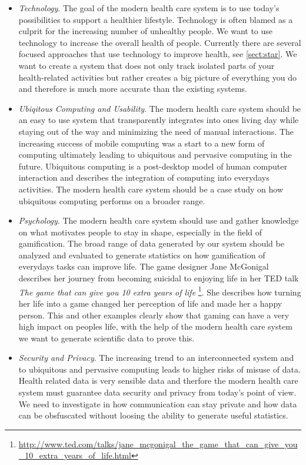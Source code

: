 \documentclass[a4paper,11pt]{article}
\begin{document}
\begin{itemize}
	\item \emph{Technology}. 
	The goal of the modern health care system is to use today's possibilities to support a healthier lifestyle. Technology is often blamed as a culprit for the increasing number of unhealthy people. We want to use technology to increase the overall health of people. Currently there are several focused approaches that use technology to improve health, see \ref{sect:star}. We want to create a system that does not only track isolated parts of your health-related activities but rather creates a big picture of everything you do and therefore is much more accurate than the existing systems.
	\item \emph{Ubiqitous Computing and Usability}.
	The modern health care system should be an easy to use system that transparently integrates into ones living day while staying out of the way and minimizing the need of manual interactions. The increasing success of mobile computing was a start to a new form of computing ultimately leading to ubiquitous and pervasive computing in the future. Ubiquitous computing is a post-desktop model of human computer interaction and describes the integration of computing into everydays activities. The modern health care system should be a case study on how ubiquitous computing performs on a broader range. 
	\item \emph{Psychology}.
	The modern health care system should use and gather knowledge on what motivates people to stay in shape, especially in the field of gamification. The broad range of data generated by our system should be analyzed and evaluated to generate statistics on how gamification of everydays tasks can improve life. The game designer Jane McGonigal describes her journey from becoming suicidal to enjoying life in her TED talk \emph{The game that can give you 10 extra years of life} \footnote{\url{http://www.ted.com/talks/jane_mcgonigal_the_game_that_can_give_you_10_extra_years_of_life.html}}. She describes how turning her life into a game changed her perception of life and made her a happy person. This and other examples clearly show that gaming can have a very high impact on peoples life, with the help of the modern health care system we want to generate scientific data to prove this.
	\item \emph{Security and Privacy}.
	The increasing trend to an interconnected system and to ubiquitous and pervasive computing leads to higher risks of misuse of data. Health related data is very sensible data and therfore the modern health care system must guarantee data security and privacy from today's point of view. We need to investigate in how communication can stay private and how data can be obsfuscated without loosing the ability to generate useful statistics.
\end{itemize}
\end{document}
